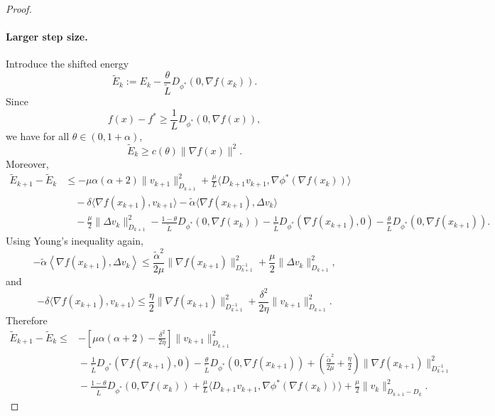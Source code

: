 \documentclass{article}
\theoremstyle{plain}
\theoremstyle{remark}
\newcommand{\dual}[1]{\left\langle {#1} \right\rangle}
\begin{document}
\begin{proof}
\paragraph{Larger step size.} Introduce the shifted energy
\[
\widetilde{E}_k := E_k - \frac{\theta}{\tilde{L}}D_{\phi^*}(0,\nabla f(x_k)).
\]
Since
\[
f(x) - f^* \ge \frac{1}{L}D_{\phi^*}(0,\nabla f(x)),
\]
we have for all $\theta \in (0,1+\alpha)$,
\[
\widetilde{E}_k \ge c(\theta)\|\nabla f(x)\|^2.
\]
Moreover,
\begin{align*}
\widetilde{E}_{k+1} - \widetilde{E}_k
&\le -\mu\alpha(\alpha+2)\|v_{k+1}\|_{D_{k+1}}^2
+ \frac{\mu}{L}\langle D_{k+1}v_{k+1}, \nabla\phi^*(\nabla f(x_k))\rangle\\
&\quad - \delta\langle\nabla f(x_{k+1}), v_{k+1}\rangle
- \tilde{\alpha}\langle\nabla f(x_{k+1}), \Delta v_k\rangle\\
&\quad - \frac{\mu}{2}\|\Delta v_k\|_{D_{k+1}}^2
- \frac{1-\theta}{\tilde{L}}D_{\phi^*}(0,\nabla f(x_k))
- \frac{1}{\tilde{L}}D_{\phi^*}(\nabla f(x_{k+1}),0)
- \frac{\theta}{\tilde{L}}D_{\phi^*}(0,\nabla f(x_{k+1})).
\end{align*}
Using Young's inequality again,
\[
-\tilde{\alpha}\dual{\nabla f(x_{k+1}),\Delta v_k}\leq \frac{\tilde{\alpha}^2}{2\mu}\|\nabla f(x_{k+1})\|_{D_{k+1}^{-1}}^2 + \frac{\mu}{2}\|\Delta v_k\|_{D_{k+1}}^2,
\]
and
\[
-\delta\langle\nabla f(x_{k+1}), v_{k+1}\rangle
\le \frac{\eta}{2}\|\nabla f(x_{k+1})\|_{D_{k+1}^{-1}}^2 + \frac{\delta^2}{2\eta}\|v_{k+1}\|_{D_{k+1}}^2.
\]
Therefore
\begin{equation}\label{eq:Etilde}
    \begin{aligned}
\widetilde{E}_{k+1} - \widetilde{E}_k
\le{}& -\left[\mu\alpha(\alpha+2) - \frac{\delta^2}{2\eta}\right]\|v_{k+1}\|_{D_{k+1}}^2\\
&{}-\frac{1}{\tilde{L}}D_{\phi^*}(\nabla f(x_{k+1}),0)-\frac{\theta}{\tilde{L}}D_{\phi^*}(0,\nabla f(x_{k+1}))+\left(\frac{\tilde{\alpha}^2}{2\mu}+\frac{\eta}{2}\right)\|\nabla f(x_{k+1})\|_{D_{k+1}^{-1}}^2\\
&{}-\frac{1-\theta}{\tilde{L}}D_{\phi^*}(0,\nabla f(x_k))+\frac{\mu}{L}\langle D_{k+1}v_{k+1}, \nabla\phi^*(\nabla f(x_k))\rangle + \frac{\mu}{2}\|v_k\|_{D_{k+1}-D_k}^2.
\end{aligned}
\end{equation}


\end{proof}
\end{document}
